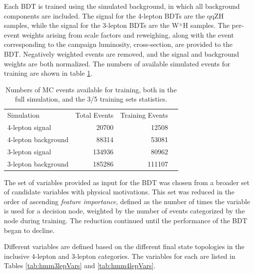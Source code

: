 Each BDT is trained using the simulated background, in which all background components are included.
The signal for the 4-lepton BDTs are the qqZH samples, while the signal for the 3-lepton BDTs are the W$^\pm$H samples.
The per-event weights arising from scale factors and reweighing, along with the event corresponding to the campaign luminosity, cross-section, are provided to the BDT.
Negatively weighted events are removed, and the signal and background weights are both normalized.
The numbers of available simulated events for training are shown in table \ref{tab:hmmSampleStatistics}.

\begin{table}[htbp]
 \begin{center}
\begin{tabular}{l r r r}\toprule
Simulation           & Total Events & Training Events \\
4-lepton signal      & 20700        & 12508    \\
4-lepton background  & 88314        & 53081    \\
3-lepton signal      & 134936       & 80962    \\
3-lepton background  & 185286       & 111107   \\
\bottomrule\end{tabular} 
 \end{center}
 \caption{Numbers of MC events available for training, both in the full simulation, and the 3/5 training sets statistics.}
\label{tab:hmmSampleStatistics}
\end{table}

The set of variables provided as input for the BDT was chosen from a broader set of candidate variables with physical motivations.
This set was reduced in the order of ascending \emph{feature importance}, defined as the number of times the variable is used for a decision node, weighted by the number of events categorized by the node during training.
The reduction continued until the performance of the BDT began to decline.

Different variables are defined based on the different final state topologies in the inclusive 4-lepton and 3-lepton categories.
The variables for each are listed in Tables \ref{tab:hmm3lepVars} and \ref{tab:hmm4lepVars}.


